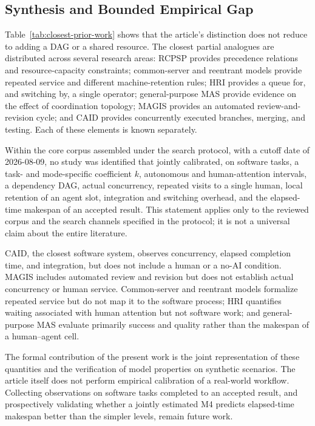 \subsection{Synthesis and Bounded Empirical Gap}

Table~\ref{tab:closest-prior-work} shows that the article's distinction does
not reduce to adding a DAG or a shared resource. The closest partial analogues
are distributed across several research areas: RCPSP provides precedence
relations and resource-capacity constraints; common-server and reentrant
models provide repeated service and different machine-retention rules; HRI
provides a queue for, and switching by, a single operator; general-purpose MAS
provide evidence on the effect of coordination topology; MAGIS provides an
automated review-and-revision cycle; and CAID provides concurrently executed
branches, merging, and testing. Each of these elements is known separately.

Within the core corpus assembled under the search protocol, with a cutoff date
of 2026-08-09, no study was identified that jointly calibrated, on software
tasks, a task- and mode-specific coefficient $k$, autonomous and human-attention
intervals, a dependency DAG, actual concurrency, repeated visits to a single
human, local retention of an agent slot, integration and switching overhead,
and the elapsed-time makespan of an accepted result. This statement applies
only to the reviewed corpus and the search channels specified in the protocol;
it is not a universal claim about the entire literature.

CAID, the closest software system, observes concurrency, elapsed completion
time, and integration, but does not include a human or a no-AI condition. MAGIS
includes automated review and revision but does not establish actual
concurrency or human service. Common-server and reentrant models formalize
repeated service but do not map it to the software process; HRI quantifies
waiting associated with human attention but not software work; and
general-purpose MAS evaluate primarily
success and quality rather than the makespan of a human--agent cell.

The formal contribution of the present work is the joint representation of
these quantities and the verification of model properties on synthetic
scenarios. The article itself does not perform empirical calibration of a
real-world workflow. Collecting observations on software tasks completed to an
accepted result, and prospectively validating whether a jointly estimated M4
predicts elapsed-time makespan better than the simpler levels, remain future
work.


